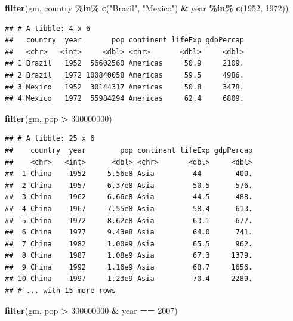 \documentclass[
]{krantz}
\newenvironment{Shaded}{\begin{snugshade}}{\end{snugshade}}
\newcommand{\DecValTok}[1]{\textcolor[rgb]{0.00,0.00,0.81}{#1}}
\newcommand{\KeywordTok}[1]{\textcolor[rgb]{0.13,0.29,0.53}{\textbf{#1}}}
\newcommand{\NormalTok}[1]{#1}
\newcommand{\OperatorTok}[1]{\textcolor[rgb]{0.81,0.36,0.00}{\textbf{#1}}}
\newcommand{\StringTok}[1]{\textcolor[rgb]{0.31,0.60,0.02}{#1}}
\begin{document}
\begin{Shaded}
\begin{Highlighting}[]
\KeywordTok{filter}\NormalTok{(gm, country }\OperatorTok{\%in\%}\StringTok{ }\KeywordTok{c}\NormalTok{(}\StringTok{"Brazil"}\NormalTok{, }\StringTok{"Mexico"}\NormalTok{) }\OperatorTok{\&}\StringTok{ }\NormalTok{year }\OperatorTok{\%in\%}\StringTok{ }\KeywordTok{c}\NormalTok{(}\DecValTok{1952}\NormalTok{, }\DecValTok{1972}\NormalTok{))}
\end{Highlighting}
\end{Shaded}

\begin{verbatim}
## # A tibble: 4 x 6
##   country  year       pop continent lifeExp gdpPercap
##   <chr>   <int>     <dbl> <chr>       <dbl>     <dbl>
## 1 Brazil   1952  56602560 Americas     50.9     2109.
## 2 Brazil   1972 100840058 Americas     59.5     4986.
## 3 Mexico   1952  30144317 Americas     50.8     3478.
## 4 Mexico   1972  55984294 Americas     62.4     6809.
\end{verbatim}

\begin{Shaded}
\begin{Highlighting}[]
\KeywordTok{filter}\NormalTok{(gm, pop }\OperatorTok{\textgreater{}}\StringTok{ }\DecValTok{300000000}\NormalTok{)}
\end{Highlighting}
\end{Shaded}

\begin{verbatim}
## # A tibble: 25 x 6
##    country  year        pop continent lifeExp gdpPercap
##    <chr>   <int>      <dbl> <chr>       <dbl>     <dbl>
##  1 China    1952     5.56e8 Asia         44        400.
##  2 China    1957     6.37e8 Asia         50.5      576.
##  3 China    1962     6.66e8 Asia         44.5      488.
##  4 China    1967     7.55e8 Asia         58.4      613.
##  5 China    1972     8.62e8 Asia         63.1      677.
##  6 China    1977     9.43e8 Asia         64.0      741.
##  7 China    1982     1.00e9 Asia         65.5      962.
##  8 China    1987     1.08e9 Asia         67.3     1379.
##  9 China    1992     1.16e9 Asia         68.7     1656.
## 10 China    1997     1.23e9 Asia         70.4     2289.
## # ... with 15 more rows
\end{verbatim}

\begin{Shaded}
\begin{Highlighting}[]
\KeywordTok{filter}\NormalTok{(gm, pop }\OperatorTok{\textgreater{}}\StringTok{ }\DecValTok{300000000} \OperatorTok{\&}\StringTok{ }\NormalTok{year }\OperatorTok{==}\StringTok{ }\DecValTok{2007}\NormalTok{)}
\end{Highlighting}
\end{Shaded}
\end{document}
